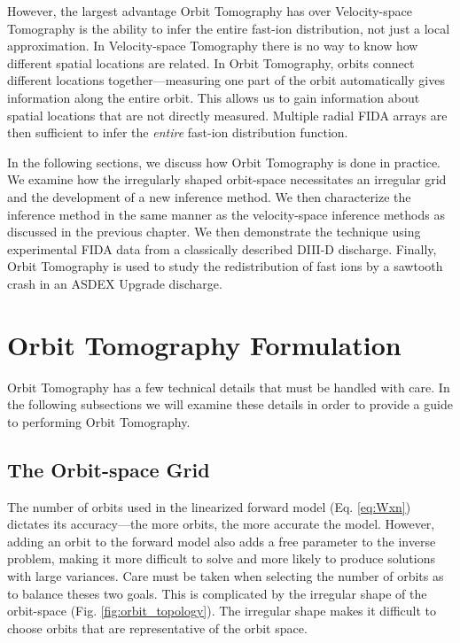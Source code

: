 However, the largest advantage Orbit Tomography has over Velocity-space Tomography is the ability to infer the entire fast-ion distribution, not just a local approximation. In Velocity-space Tomography there is no way to know how different spatial locations are related. In Orbit Tomography, orbits connect different locations together---measuring one part of the orbit automatically gives information along the entire orbit. This allows us to gain information about spatial locations that are not directly measured. Multiple radial FIDA arrays are then sufficient to infer the \textit{entire} fast-ion distribution function. 

In the following sections, we discuss how Orbit Tomography is done in practice. We examine how the irregularly shaped orbit-space necessitates an irregular grid and the development of a new inference method. We then characterize the inference method in the same manner as the velocity-space inference methods as discussed in the previous chapter.
We then demonstrate the technique using experimental FIDA data from a classically described DIII-D discharge. Finally, Orbit Tomography is used to study the redistribution of fast ions by a sawtooth crash in an ASDEX Upgrade discharge.

\section{Orbit Tomography Formulation}\label{sec:orbit_tomography}
Orbit Tomography has a few technical details that must be handled with care. In the following subsections we will examine these details in order to provide a guide to performing Orbit Tomography.

\subsection{The Orbit-space Grid}
The number of orbits used in the linearized forward model (Eq. \ref{eq:Wxn}) dictates its accuracy---the more orbits, the more accurate the model.
However, adding an orbit to the forward model also adds a free parameter to the inverse problem, making it more difficult to solve and more likely to produce solutions with large variances.
Care must be taken when selecting the number of orbits as to balance theses two goals.
This is complicated by the irregular shape of the orbit-space (Fig. \ref{fig:orbit_topology}). The irregular shape makes it difficult to choose orbits that are representative of the orbit space.

